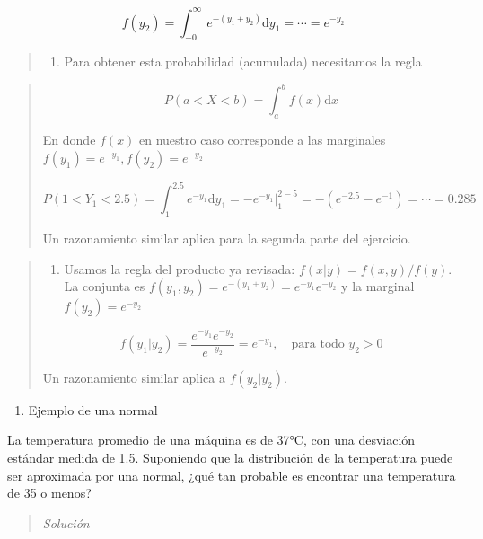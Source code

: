 \documentclass[
  letterpaper,
  DIV=11,
  numbers=noendperiod]{scrartcl}
\providecommand{\tightlist}{%
  \setlength{\itemsep}{0pt}\setlength{\parskip}{0pt}}\usepackage{longtable,booktabs,array}
\begin{document}
\[
  f(y_2)=\int_{-0}^{\infty}e^{-(y_1+y_2)}\text{d}y_1=\cdots=e^{-y_2}
\]

\begin{quote}
\begin{enumerate}
\def\labelenumi{\alph{enumi})}
\setcounter{enumi}{1}
\tightlist
\item
  Para obtener esta probabilidad (acumulada) necesitamos la regla
\end{enumerate}
\end{quote}

\begin{quote}
\[
 P(a < X < b)=\int_a^b f(x)\text{d}x
\]

En donde \(f(x)\) en nuestro caso corresponde a las marginales
\(f(y_1)=e^{-y_1}, f(y_2)=e^{-y_2}\)

\[
 P(1<Y_1<2.5)=\int_1^{2.5}e^{-y_1}\text{d}y_1=-e^{-y_1}\Big|_1^{2-5}=-\left(e^{-2.5}-e^{-1}\right)=\cdots=0.285
\]

Un razonamiento similar aplica para la segunda parte del ejercicio.
\end{quote}

\begin{quote}
\begin{enumerate}
\def\labelenumi{\alph{enumi})}
\setcounter{enumi}{2}
\tightlist
\item
  Usamos la regla del producto ya revisada: \(f(x|y)=f(x,y)/f(y)\). La
  conjunta es \(f(y_1,y_2)=e^{-(y_1+y_2)}=e^{-y_1}e^{-y_2}\) y la
  marginal \(f(y_2)=e^{-y_2}\)
\end{enumerate}

\[
 f(y_1|y_2)=\frac{e^{-y_1}e^{-y_2}}{e^{-y_2}}=e^{-y_1},\quad \text{para todo } y_2>0
\]

Un razonamiento similar aplica a \(f(y_2|y_2)\).
\end{quote}

\begin{enumerate}
\def\labelenumi{\arabic{enumi}.}
\setcounter{enumi}{7}
\tightlist
\item
  Ejemplo de una normal
\end{enumerate}

La temperatura promedio de una máquina es de 37°C, con una desviación
estándar medida de 1.5. Suponiendo que la distribución de la temperatura
puede ser aproximada por una normal, ¿qué tan probable es encontrar una
temperatura de 35 o menos?

\begin{quote}
\emph{Solución}
\end{quote}
\end{document}
